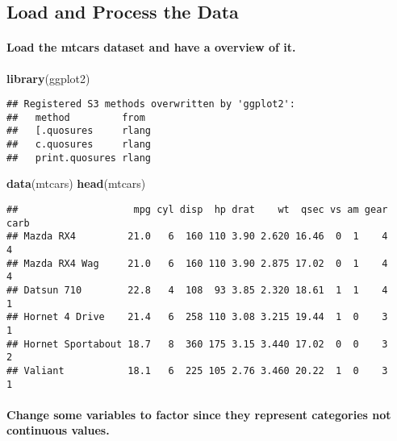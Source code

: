\documentclass[]{article}
\newenvironment{Shaded}{\begin{snugshade}}{\end{snugshade}}
\newcommand{\KeywordTok}[1]{\textcolor[rgb]{0.13,0.29,0.53}{\textbf{#1}}}
\newcommand{\NormalTok}[1]{#1}
\let\oldparagraph\paragraph
\renewcommand{\paragraph}[1]{\oldparagraph{#1}\mbox{}}
\begin{document}
\hypertarget{load-and-process-the-data}{%
\subsection{Load and Process the Data}\label{load-and-process-the-data}}

\hypertarget{load-the-mtcars-dataset-and-have-a-overview-of-it.}{%
\paragraph{Load the mtcars dataset and have a overview of
it.}\label{load-the-mtcars-dataset-and-have-a-overview-of-it.}}

\begin{Shaded}
\begin{Highlighting}[]
\KeywordTok{library}\NormalTok{(ggplot2)}
\end{Highlighting}
\end{Shaded}

\begin{verbatim}
## Registered S3 methods overwritten by 'ggplot2':
##   method         from 
##   [.quosures     rlang
##   c.quosures     rlang
##   print.quosures rlang
\end{verbatim}

\begin{Shaded}
\begin{Highlighting}[]
\KeywordTok{data}\NormalTok{(mtcars)}
\KeywordTok{head}\NormalTok{(mtcars)}
\end{Highlighting}
\end{Shaded}

\begin{verbatim}
##                    mpg cyl disp  hp drat    wt  qsec vs am gear carb
## Mazda RX4         21.0   6  160 110 3.90 2.620 16.46  0  1    4    4
## Mazda RX4 Wag     21.0   6  160 110 3.90 2.875 17.02  0  1    4    4
## Datsun 710        22.8   4  108  93 3.85 2.320 18.61  1  1    4    1
## Hornet 4 Drive    21.4   6  258 110 3.08 3.215 19.44  1  0    3    1
## Hornet Sportabout 18.7   8  360 175 3.15 3.440 17.02  0  0    3    2
## Valiant           18.1   6  225 105 2.76 3.460 20.22  1  0    3    1
\end{verbatim}

\hypertarget{change-some-variables-to-factor-since-they-represent-categories-not-continuous-values.}{%
\paragraph{Change some variables to factor since they represent
categories not continuous
values.}\label{change-some-variables-to-factor-since-they-represent-categories-not-continuous-values.}}
\end{document}
